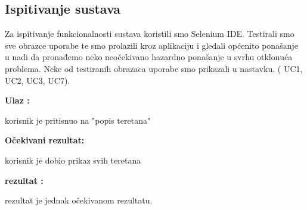 			\subsection{Ispitivanje sustava}
		
		 	 Za ispitivanje funkcionalnosti sustava koristili smo Selenium IDE. Testirali smo
		 	 sve obrazce uporabe te smo prolazili kroz aplikaciju i gledali općenito ponašanje
		 	 u nadi da pronađemo neko neočekivano hazardno ponašanje u svrhu otklonuća problema.
		 	 Neke od testiranih obrazaca uporabe smo prikazali u nastavku. ( UC1, UC2, UC3, UC7).
		 	 
		 	 
	
	            \noindent {}
                \begin{packed_item}
						\item  \textbf{Ulaz : } 
						\item[] \begin{packed_enum}
	
							\item korisnik je pritisnuo na "popis teretana"

						\end{packed_enum}
						\item  \textbf{Očekivani rezultat: } 
						\item[] \begin{packed_enum}
	
							\item korisnik je dobio prikaz svih teretana

						\end{packed_enum}
						
						\item  \textbf{rezultat : }
						\item[] \begin{packed_enum}
	
							\item rezultat je jednak očekivanom rezultatu.

						\end{packed_enum}

				\end{packed_item}
				
